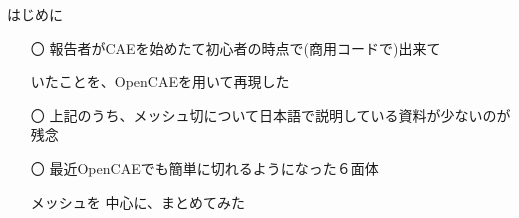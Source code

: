 \begin{frame}{はじめに}
  \begin{itemize}[itemsep=2.5ex, leftmargin=3mm]
      \large
      \item[〇] 報告者がCAEを始めたて初心者の時点で(商用コードで)出来て

                いたことを、OpenCAEを用いて再現した

      \item[〇] 上記のうち、メッシュ切について日本語で説明している資料が少ないのが残念

      \item[〇] 最近OpenCAEでも簡単に切れるようになった６面体

                メッシュを 中心に、まとめてみた
  \end{itemize}
\end{frame}
